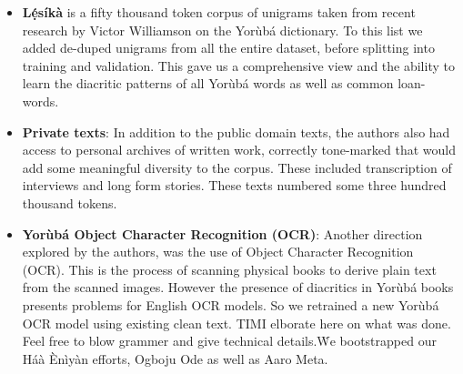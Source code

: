 \documentclass{article} %
\begin{document}
\begin{itemize}
\item \textbf{L\d{\'e}s{\'i}k{\`a}} is a fifty thousand token corpus of unigrams taken from recent research by Victor Williamson on the Yor{\`u}b{\'a} dictionary. To this list we added de-duped unigrams from all the entire dataset, before splitting into training and validation. This gave us a comprehensive view and the ability to learn the diacritic patterns of all Yor{\`u}b{\'a} words as well as common loan-words.

\item \textbf{Private texts}: In addition to the public domain texts, the authors also had access to personal archives of written work, correctly tone-marked that would add some meaningful diversity to the corpus. These included transcription of interviews and long form stories. These texts numbered some three hundred thousand tokens.

\item \textbf{{Yor{\`u}b{\'a} Object Character Recognition (OCR)}}: Another direction explored by the authors, was the use of Object Character Recognition (OCR).  This is the process of scanning physical books to derive plain text from the scanned images. However the presence of diacritics in Yor{\`u}b{\'a} books presents problems for English OCR models. So we retrained a new Yor{\`u}b{\'a} OCR model using existing clean text. TIMI elborate here on what was done. Feel free to blow grammer and give technical details.\. We bootstrapped our Háà Ènìyàn efforts, Ogboju Ode as well as Aaro Meta.
\end{itemize}
\end{document}
